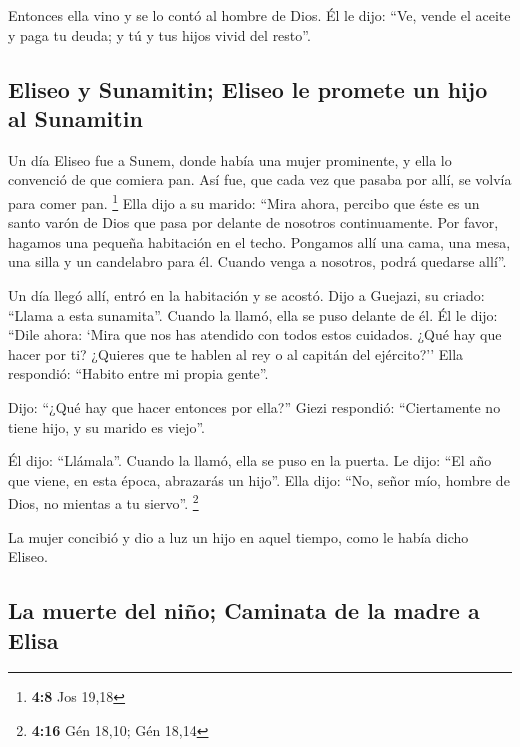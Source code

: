  Entonces ella vino y se lo contó al hombre de Dios. Él le
dijo: ``Ve, vende el aceite y paga tu deuda; y tú y tus hijos vivid del
resto''.

\hypertarget{eliseo-y-sunamitin-eliseo-le-promete-un-hijo-al-sunamitin}{%
\subsection{Eliseo y Sunamitin; Eliseo le promete un hijo al
Sunamitin}\label{eliseo-y-sunamitin-eliseo-le-promete-un-hijo-al-sunamitin}}

 Un día Eliseo fue a Sunem, donde había una mujer
prominente, y ella lo convenció de que comiera pan. Así fue, que cada
vez que pasaba por allí, se volvía para comer pan. \footnote{\textbf{4:8}
  Jos 19,18}  Ella dijo a su marido: ``Mira ahora, percibo
que éste es un santo varón de Dios que pasa por delante de nosotros
continuamente.  Por favor, hagamos una pequeña habitación
en el techo. Pongamos allí una cama, una mesa, una silla y un candelabro
para él. Cuando venga a nosotros, podrá quedarse allí''.

 Un día llegó allí, entró en la habitación y se acostó.
 Dijo a Guejazi, su criado: ``Llama a esta sunamita''.
Cuando la llamó, ella se puso delante de él.  Él le dijo:
``Dile ahora: `Mira que nos has atendido con todos estos cuidados. ¿Qué
hay que hacer por ti? ¿Quieres que te hablen al rey o al capitán del
ejército?'' Ella respondió: ``Habito entre mi propia gente''.

 Dijo: ``¿Qué hay que hacer entonces por ella?'' Giezi
respondió: ``Ciertamente no tiene hijo, y su marido es viejo''.

 Él dijo: ``Llámala''. Cuando la llamó, ella se puso en
la puerta.  Le dijo: ``El año que viene, en esta época,
abrazarás un hijo''. Ella dijo: ``No, señor mío, hombre de Dios, no
mientas a tu siervo''. \footnote{\textbf{4:16} Gén 18,10; Gén 18,14}

 La mujer concibió y dio a luz un hijo en aquel tiempo,
como le había dicho Eliseo.

\hypertarget{la-muerte-del-niuxf1o-caminata-de-la-madre-a-elisa}{%
\subsection{La muerte del niño; Caminata de la madre a
Elisa}\label{la-muerte-del-niuxf1o-caminata-de-la-madre-a-elisa}}

